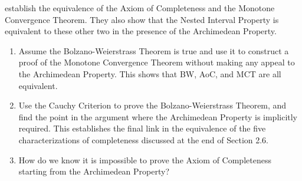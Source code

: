 \documentclass{lew98_solutions}
\begin{document}
\begin{exercise}
\label{ex:2.6.7}
     establish the equivalence of the Axiom of Completeness and the Monotone Convergence Theorem. They also show that the Nested Interval Property is equivalent to these other two in the presence of the Archimedean Property.
    \begin{enumerate}
        \item Assume the Bolzano-Weierstrass Theorem is true and use it to construct a proof of the Monotone Convergence Theorem without making any appeal to the Archimedean Property. This shows that BW, AoC, and MCT are all equivalent.

        \item Use the Cauchy Criterion to prove the Bolzano-Weierstrass Theorem, and find the point in the argument where the Archimedean Property is implicitly required. This establishes the final link in the equivalence of the five characterizations of completeness discussed at the end of Section 2.6.

        \item How do we know it is impossible to prove the Axiom of Completeness starting from the Archimedean Property?
    \end{enumerate}
\end{exercise}
\end{document}

